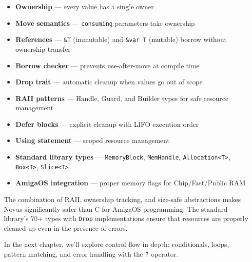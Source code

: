 \begin{itemize}
    \item \textbf{Ownership} --- every value has a single owner
    \item \textbf{Move semantics} --- \texttt{consuming} parameters take ownership
    \item \textbf{References} --- \texttt{\&T} (immutable) and \texttt{\&var T} (mutable) borrow without ownership transfer
    \item \textbf{Borrow checker} --- prevents use-after-move at compile time
    \item \textbf{Drop trait} --- automatic cleanup when values go out of scope
    \item \textbf{RAII patterns} --- Handle, Guard, and Builder types for safe resource management
    \item \textbf{Defer blocks} --- explicit cleanup with LIFO execution order
    \item \textbf{Using statement} --- scoped resource management
    \item \textbf{Standard library types} --- \texttt{MemoryBlock}, \texttt{MemHandle}, \texttt{Allocation<T>}, \texttt{Box<T>}, \texttt{Slice<T>}
    \item \textbf{AmigaOS integration} --- proper memory flags for Chip/Fast/Public RAM
\end{itemize}

The combination of RAII, ownership tracking, and size-safe abstractions makes Novus significantly safer than C for AmigaOS programming. The standard library's 70+ types with \texttt{Drop} implementations ensure that resources are properly cleaned up even in the presence of errors.

In the next chapter, we'll explore control flow in depth: conditionals, loops, pattern matching, and error handling with the \texttt{?} operator.
